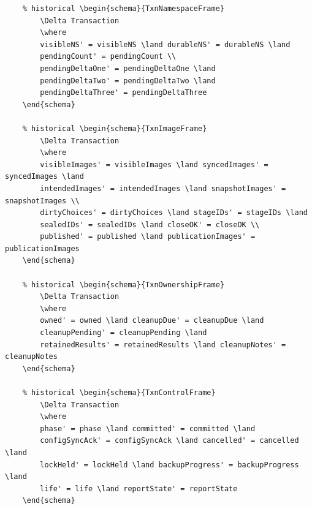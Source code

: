 \documentclass{article}
\begin{document}
\begin{verbatim}
	% historical \begin{schema}{TxnNamespaceFrame}
		\Delta Transaction
		\where
		visibleNS' = visibleNS \land durableNS' = durableNS \land
		pendingCount' = pendingCount \\
		pendingDeltaOne' = pendingDeltaOne \land
		pendingDeltaTwo' = pendingDeltaTwo \land
		pendingDeltaThree' = pendingDeltaThree
	\end{schema}

	% historical \begin{schema}{TxnImageFrame}
		\Delta Transaction
		\where
		visibleImages' = visibleImages \land syncedImages' = syncedImages \land
		intendedImages' = intendedImages \land snapshotImages' = snapshotImages \\
		dirtyChoices' = dirtyChoices \land stageIDs' = stageIDs \land
		sealedIDs' = sealedIDs \land closeOK' = closeOK \\
		published' = published \land publicationImages' = publicationImages
	\end{schema}

	% historical \begin{schema}{TxnOwnershipFrame}
		\Delta Transaction
		\where
		owned' = owned \land cleanupDue' = cleanupDue \land
		cleanupPending' = cleanupPending \land
		retainedResults' = retainedResults \land cleanupNotes' = cleanupNotes
	\end{schema}

	% historical \begin{schema}{TxnControlFrame}
		\Delta Transaction
		\where
		phase' = phase \land committed' = committed \land
		configSyncAck' = configSyncAck \land cancelled' = cancelled \land
		lockHeld' = lockHeld \land backupProgress' = backupProgress \land
		life' = life \land reportState' = reportState
	\end{schema}


\end{verbatim}
\end{document}
